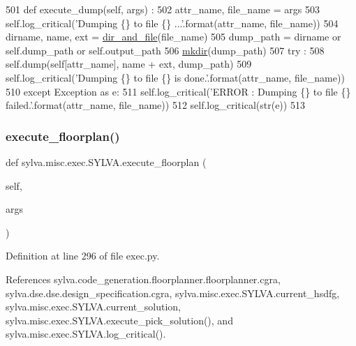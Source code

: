 \begin{DoxyCode}
501   \textcolor{keyword}{def }execute\_dump(self, args) :
502     attr\_name, file\_name = args
503     self.log\_critical(\textcolor{stringliteral}{'Dumping \{\} to file \{\} ...'}.format(attr\_name, file\_name))
504     dirname, name, ext = \hyperlink{namespacesylva_1_1misc_1_1util_a0ce6d1d719234031353b60ac60f2af0d}{dir\_and\_file}(file\_name)
505     dump\_path = dirname \textcolor{keywordflow}{or} self.dump\_path \textcolor{keywordflow}{or} self.output\_path
506     \hyperlink{namespacesylva_1_1misc_1_1util_af426e429c40209bbb46e3a0e8f139a44}{mkdir}(dump\_path)
507     \textcolor{keywordflow}{try} :
508       self.dump(self[attr\_name], name + ext, dump\_path)
509       self.log\_critical(\textcolor{stringliteral}{'Dumping \{\} to file \{\} is done.'}.format(attr\_name, file\_name))
510     \textcolor{keywordflow}{except} Exception \textcolor{keyword}{as} e:
511       self.log\_critical(\textcolor{stringliteral}{'ERROR : Dumping \{\} to file \{\} failed.'}.format(attr\_name, file\_name))
512       self.log\_critical(str(e))
513 
\end{DoxyCode}
\mbox{\label{classsylva_1_1misc_1_1exec_1_1_s_y_l_v_a_ad398d309b523adda00dcb7929c568e65}} 
\subsubsection{\texorpdfstring{execute\+\_\+floorplan()}{execute\_floorplan()}}
{\footnotesize\ttfamily def sylva.\+misc.\+exec.\+S\+Y\+L\+V\+A.\+execute\+\_\+floorplan (\begin{DoxyParamCaption}\item[{}]{self,  }\item[{}]{args }\end{DoxyParamCaption})}



Definition at line 296 of file exec.\+py.



References sylva.\+code\+\_\+generation.\+floorplanner.\+floorplanner.\+cgra, sylva.\+dse.\+dse.\+design\+\_\+specification.\+cgra, sylva.\+misc.\+exec.\+S\+Y\+L\+V\+A.\+current\+\_\+hsdfg, sylva.\+misc.\+exec.\+S\+Y\+L\+V\+A.\+current\+\_\+solution, sylva.\+misc.\+exec.\+S\+Y\+L\+V\+A.\+execute\+\_\+pick\+\_\+solution(), and sylva.\+misc.\+exec.\+S\+Y\+L\+V\+A.\+log\+\_\+critical().



